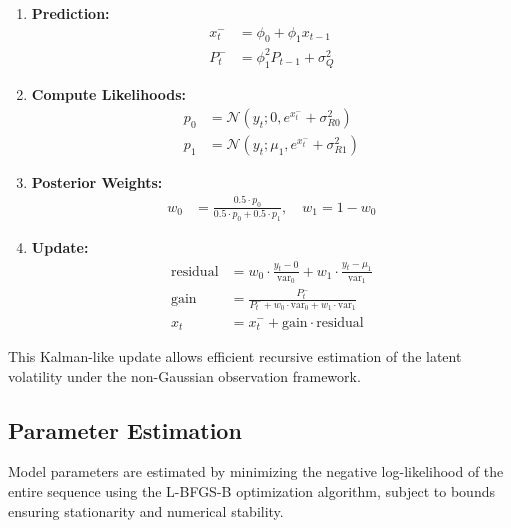 \begin{enumerate}
    \item \textbf{Prediction:}
    \begin{align}
        x_t^- &= \phi_0 + \phi_1 x_{t-1} \\
        P_t^- &= \phi_1^2 P_{t-1} + \sigma_Q^2
    \end{align}
    
    \item \textbf{Compute Likelihoods:}
    \begin{align}
        p_0 &= \mathcal{N}(y_t; 0, e^{x_t^-} + \sigma_{R0}^2) \\
        p_1 &= \mathcal{N}(y_t; \mu_1, e^{x_t^-} + \sigma_{R1}^2)
    \end{align}
    
    \item \textbf{Posterior Weights:}
    \begin{align}
        w_0 &= \frac{0.5 \cdot p_0}{0.5 \cdot p_0 + 0.5 \cdot p_1}, \quad w_1 = 1 - w_0
    \end{align}
    
    \item \textbf{Update:}
    \begin{align}
        \text{residual} &= w_0 \cdot \frac{y_t - 0}{\text{var}_0} + w_1 \cdot \frac{y_t - \mu_1}{\text{var}_1} \\
        \text{gain} &= \frac{P_t^-}{P_t^- + w_0 \cdot \text{var}_0 + w_1 \cdot \text{var}_1} \\
        x_t &= x_t^- + \text{gain} \cdot \text{residual}
    \end{align}
\end{enumerate}

This Kalman-like update allows efficient recursive estimation of the latent volatility under the non-Gaussian observation framework.

\subsection{Parameter Estimation}

Model parameters are estimated by minimizing the negative log-likelihood of the entire sequence using the L-BFGS-B optimization algorithm, subject to bounds ensuring stationarity and numerical stability.


